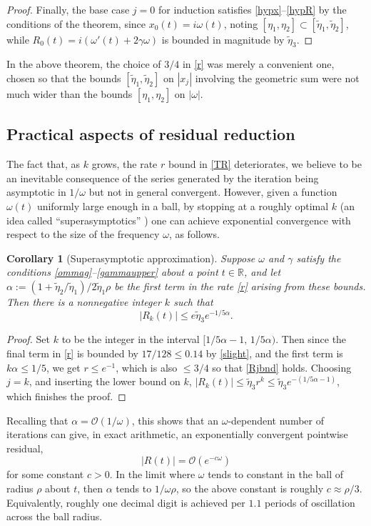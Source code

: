\documentclass[10pt]{article}
\newcommand{\R}{\mathbb{R}}
\newcommand{\bigO}{{\mathcal O}}
\newtheorem{cor}[thm]{Corollary}
\newcommand{\om}{\omega}
\newcommand{\g}{\gamma}
\newcommand{\te}{\tilde\eta}
\begin{document}
\begin{proof}
Finally, the base case $j=0$ for induction
satisfies \cref{hypx}--\cref{hypR}
by the conditions of the theorem,
since $x_0(t) = i\om(t)$, noting $[\eta_1,\eta_2] \subset [\te_1,\te_2]$,
while $R_0(t) = i\left(\om'(t) + 2\g\om \right)$ is bounded in magnitude by $\te_3$.
\end{proof}

In the above theorem, the choice of $3/4$ in \cref{r} was merely a convenient one, chosen so that the bounds $[\te_1,\te_2]$ on $|x_j|$
involving the geometric sum were
not much wider than the bounds $[\eta_1,\eta_2]$ on $|\om|$.


\subsection{Practical aspects of residual reduction \label{pracres}}

The fact that, as $k$ grows,
the rate $r$ bound in \cref{TR} deteriorates, we believe to be
an inevitable consequence of
the series generated by the iteration being asymptotic in $1/\om$ but not in general convergent.
However, given a function $\om(t)$ uniformly large enough
in a ball,
by stopping at a roughly optimal $k$ (an idea
called ``superasymptotics'' \cite{berrysuper,boydsuper})
one can achieve
exponential convergence with respect to the size of the frequency $\om$,
as follows.

\begin{cor}[Superasymptotic approximation]\label{super}
  Suppose $\om$ and $\g$ satisfy the conditions \cref{ommag}--\cref{gammaupper}
  about a point $t\in\R$,
  and let $\alpha := (1+\te_2/\te_1)/2\te_1\rho$ be the
  first term in the rate \cref{r} arising from these bounds.
  Then there is a nonnegative integer $k$ such that
  $$
  |R_k(t)|  \le  e \te_3 e^{-1/5\alpha}.
  $$
\end{cor}
\begin{proof}
  Set $k$ to be the integer in the interval $[1/5\alpha-1, \, 1/5\alpha)$.
    Then since the final term in \cref{r} is bounded by $17/128 \leq 0.14$
    by \cref{slight}, and the
    first term is $k\alpha \le 1/5$, we get $r\le e^{-1}$, which
    is also $\le 3/4$ so that \cref{Rjbnd} holds.
    Choosing $j=k$, and inserting the lower bound on $k$,
    $|R_k(t)| \le \te_3 r^k \le \te_3 e^{-(1/5\alpha-1)}$, which
    finishes the proof.
  \end{proof}
Recalling that $\alpha = \bigO(1/\om)$, this
shows that an $\om$-dependent
number of iterations can give, in exact arithmetic, an
exponentially convergent pointwise residual,
$$
|R(t)| = \bigO(e^{-c\om})
$$
for some constant $c>0$.
In the limit where
$\om$ tends to constant in the ball of radius $\rho$ about $t$, then
$\alpha$ tends to $1/\om\rho$, so the above
constant is roughly $c\approx \rho/3$.
Equivalently, roughly one decimal digit is achieved per
$1.1$ periods of oscillation across the ball radius.
\end{document}
